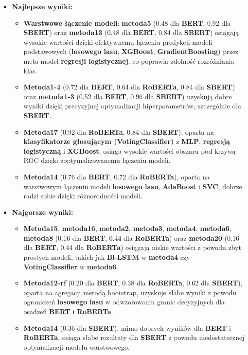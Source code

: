 \begin{itemize}
	\item \textbf{Najlepsze wyniki:}
	      \begin{itemize}
		      \item \textbf{Warstwowe łączenie modeli}: \textbf{metoda5} (0.48 dla \textbf{BERT}, 0.92 dla \textbf{SBERT}) oraz \textbf{metoda13} (0.48 dla \textbf{BERT}, 0.84 dla \textbf{SBERT}) osiągają wysokie wartości dzięki efektywnemu łączeniu predykcji modeli podstawowych (\textbf{losowego lasu}, \textbf{XGBoost}, \textbf{GradientBoosting}) przez meta-model \textbf{regresji logistycznej}, co poprawia zdolność rozróżniania klas.
		      \item \textbf{Metoda1-4} (0.72 dla \textbf{BERT}, 0.64 dla \textbf{RoBERTa}, 0.84 dla \textbf{SBERT}) oraz \textbf{metoda1-3} (0.52 dla \textbf{BERT}, 0.96 dla \textbf{SBERT}) uzyskują dobre wyniki dzięki precyzyjnej optymalizacji hiperparametrów, szczególnie dla \textbf{SBERT}.
		      \item \textbf{Metoda17} (0.92 dla \textbf{RoBERTa}, 0.84 dla \textbf{SBERT}), oparta na \textbf{klasyfikatorze głosującym (VotingClassifier)} z \textbf{MLP}, \textbf{regresją logistyczną} i \textbf{XGBoost}, osiąga wysokie wartości obszaru pod krzywą ROC dzięki zoptymalizowanemu łączeniu modeli.
		      \item \textbf{Metoda14} (0.76 dla \textbf{BERT}, 0.72 dla \textbf{RoBERTa}), oparta na warstwowym łączeniu modeli \textbf{losowego lasu}, \textbf{AdaBoost} i \textbf{SVC}, dobrze radzi sobie dzięki różnorodności modeli.
	      \end{itemize}
	\item \textbf{Najgorsze wyniki:}
	      \begin{itemize}
		      \item \textbf{Metoda15}, \textbf{metoda16}, \textbf{metoda2}, \textbf{metoda3}, \textbf{metoda4}, \textbf{metoda6}, \textbf{metoda8} (0.16 dla \textbf{BERT}, 0.44 dla \textbf{RoBERTa}) oraz \textbf{metoda20} (0.16 dla \textbf{BERT}, 0.44 dla \textbf{RoBERTa}) osiągają niskie wartości z powodu zbyt prostych modeli, takich jak \textbf{Bi-LSTM} w \textbf{metoda4} czy \textbf{VotingClassifier} w \textbf{metoda6}.
		      \item \textbf{Metoda12-rf} (0.20 dla \textbf{BERT}, 0.38 dla \textbf{RoBERTa}, 0.62 dla \textbf{SBERT}), oparta na agregacji metodą bootstrap, uzyskuje słabe wyniki z powodu ograniczeń \textbf{losowego lasu} w odwzorowaniu granic decyzyjnych dla osadzeń \textbf{BERT} i \textbf{RoBERTa}.
		      \item \textbf{Metoda14} (0.36 dla \textbf{SBERT}), mimo dobrych wyników dla \textbf{BERT} i \textbf{RoBERTa}, osiąga słabe rezultaty dla \textbf{SBERT} z powodu niedostatecznej optymalizacji modelu warstwowego.
	      \end{itemize}
\end{itemize}


